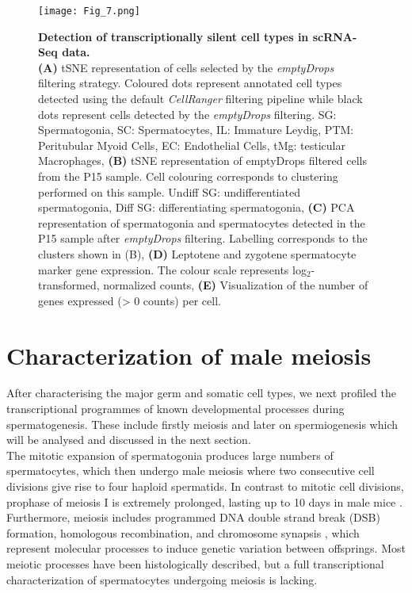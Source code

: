 \begin{figure}[!h]
\centering
\texttt{[image: Fig\_7.png]}
\caption[Transcriptionally silent cell types in spermatogenesis.]{\textbf{Detection of transcriptionally silent cell types in scRNA-Seq data.} \\
\textbf{(A)} tSNE representation of cells selected by the \emph{emptyDrops} filtering strategy. Coloured dots represent annotated cell types detected using the default \emph{CellRanger} filtering pipeline while black dots represent cells detected by the \emph{emptyDrops} filtering. SG: Spermatogonia, SC: Spermatocytes, IL: Immature Leydig, PTM: Peritubular Myoid Cells, EC: Endothelial Cells, tMg: testicular Macrophages, \textbf{(B)} tSNE representation of emptyDrops filtered cells from the P15 sample. Cell colouring corresponds to clustering performed on this sample. Undiff SG: undifferentiated spermatogonia, Diff SG: differentiating spermatogonia, \textbf{(C)} PCA representation of spermatogonia and spermatocytes detected in the P15 sample after \emph{emptyDrops} filtering. Labelling corresponds to the clusters shown in (B), \textbf{(D)} Leptotene and zygotene spermatocyte marker gene expression. The colour scale represents log$_2$-transformed, normalized counts, \textbf{(E)} Visualization of the number of genes expressed (> 0 counts) per cell.}
\label{fig3:emptyDrops}
\end{figure}

\newpage

\section{Characterization of male meiosis}

After characterising the major germ and somatic cell types, we next profiled the transcriptional programmes of known developmental processes during spermatogenesis. These include firstly meiosis and later on spermiogenesis which will be analysed and discussed in the next section.\\

The mitotic expansion of spermatogonia produces large numbers of spermatocytes, which then undergo male meiosis where two consecutive cell divisions give rise to four haploid spermatids. In contrast to mitotic cell divisions, prophase of meiosis I is extremely prolonged, lasting up to 10 days in male mice \citep{Soh2017}. Furthermore, meiosis includes programmed DNA double strand break (DSB) formation, homologous recombination, and chromosome synapsis \citep{Marston2004}, which represent molecular processes to induce genetic variation between offsprings. Most meiotic processes have been histologically described, but a full transcriptional characterization of spermatocytes undergoing meiosis is lacking. \\

